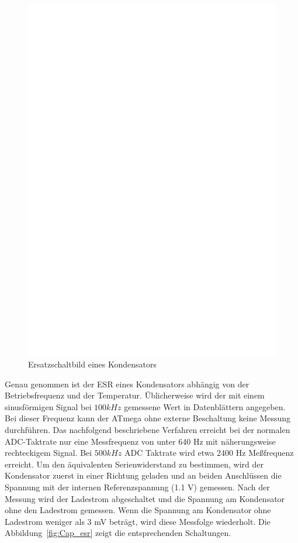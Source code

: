 \begin{figure}[H]
  \centering
    \includegraphics[]{../FIG/Cap_equiv.eps}
  \caption{Ersatzschaltbild eines Kondensators}
  \label{fig:Cap_equiv}
\end{figure}

Genau genommen ist der ESR eines Kondensators abhängig von der Betriebsfrequenz und der Temperatur.
Üblicherweise wird der mit einem sinusförmigen Signal bei \(100 kHz\) gemessene Wert in Datenblättern angegeben.
Bei dieser Frequenz kann der ATmega ohne externe Beschaltung keine Messung durchführen.
Das nachfolgend beschriebene Verfahren erreicht bei der normalen ADC-Taktrate nur eine Messfrequenz von unter 640 Hz
 mit näherungsweise rechteckigem Signal. Bei \(500 kHz\) ADC Taktrate wird etwa 2400 Hz Meßfrequenz erreicht.
Um den äquivalenten Serienwiderstand zu bestimmen,
 wird der Kondensator zuerst in einer Richtung geladen und an beiden Anschlüssen die Spannung mit der internen
Referenzspannung (1.1 V) gemessen.
Nach der Messung wird der Ladestrom abgeschaltet und die Spannung am Kondensator ohne den
Ladestrom gemessen. Wenn die Spannung am Kondensator ohne Ladestrom weniger als 3 mV beträgt, wird
diese Messfolge wiederholt.
Die Abbildung~\ref{fig:Cap_esr} zeigt die entsprechenden Schaltungen.

